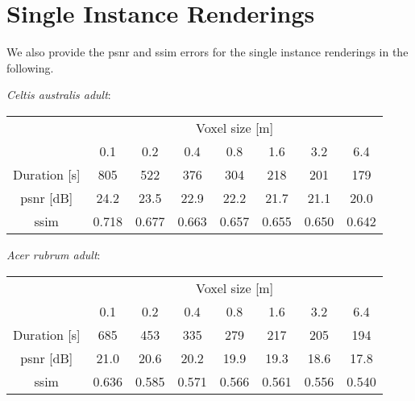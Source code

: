 \section{Single Instance Renderings}
We also provide the \ac{psnr} and \ac{ssim} errors for the single instance renderings in the following.

\textit{Celtis australis adult}:
\begin{center}
    \begin{tabular}{| c | c | c | c | c | c | c | c |}
        \cline{2-8}
        \multicolumn{1}{c|}{} & \multicolumn{7}{c|}{Voxel size [m]} \\
        \cline{2-8}
        \multicolumn{1}{c|}{} & 0.1 & 0.2 & 0.4 & 0.8 & 1.6 & 3.2 & 6.4 \\
        \hline
        Duration [s] & 805 & 522 & 376 & 304 & 218 & 201 & 179 \\
        \hline
        \acs{psnr} [dB] & 24.2 & 23.5 & 22.9 & 22.2 & 21.7 & 21.1 & 20.0 \\
        \hline
        \acs{ssim} & 0.718 & 0.677 & 0.663 & 0.657 & 0.655 & 0.650 & 0.642 \\
        \hline
    \end{tabular}
\end{center}

\textit{Acer rubrum adult}:
\begin{center}
    \begin{tabular}{| c | c | c | c | c | c | c | c |}
        \cline{2-8}
        \multicolumn{1}{c|}{} & \multicolumn{7}{c|}{Voxel size [m]} \\
        \cline{2-8}
        \multicolumn{1}{c|}{} & 0.1 & 0.2 & 0.4 & 0.8 & 1.6 & 3.2 & 6.4 \\
        \hline
        Duration [s] & 685 & 453 & 335 & 279 & 217 & 205 & 194 \\
        \hline
        \acs{psnr} [dB] & 21.0 & 20.6 & 20.2 & 19.9 & 19.3 & 18.6 & 17.8 \\
        \hline
        \acs{ssim} & 0.636 & 0.585 & 0.571 & 0.566 & 0.561 & 0.556 & 0.540 \\
        \hline
    \end{tabular}
\end{center}
